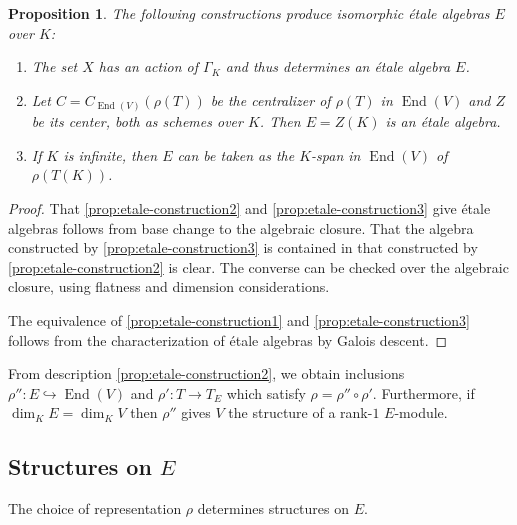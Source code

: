 \documentclass{article}
\theoremstyle{plain}
\newtheorem{proposition}[theorem]{Proposition}
\theoremstyle{definition}
\DeclareMathOperator{\End}{End}
\newcommand{\GalKbK}{\Gamma_K}
\begin{document}
\begin{proposition} \label{prop:etale-construction}
The following constructions produce isomorphic \'etale algebras $E$ over $K$:
\begin{enumerate}
\item \label{prop:etale-construction1} The set $X$ has an action of $\GalKbK$ and thus determines an \'etale algebra $E$.
\item \label{prop:etale-construction2} Let $C = C_{\End(V)}(\rho(T))$ be the centralizer of $\rho(T)$ in $\End(V)$ and $Z$ be its center, both as schemes over $K$.  Then $E = Z(K)$ is an \'etale algebra.
\item \label{prop:etale-construction3} If $K$ is infinite, then $E$ can be taken as the $K$-span in $\End(V)$ of $\rho(T(K))$.
\end{enumerate}
\end{proposition}
\begin{proof}
That \eqref{prop:etale-construction2} and \eqref{prop:etale-construction3} give \'etale algebras follows from base change to the algebraic closure.
That the algebra constructed by \eqref{prop:etale-construction3} is contained in that constructed by \eqref{prop:etale-construction2} is clear.
The converse can be checked over the algebraic closure, using flatness and dimension considerations.

The equivalence of \eqref{prop:etale-construction1} and \eqref{prop:etale-construction3} follows from the characterization of \'etale algebras by Galois descent.
\end{proof}

From description \eqref{prop:etale-construction2}, we obtain inclusions $\rho'' : E \hookrightarrow \End(V)$ and $\rho' : T \rightarrow T_E$ which satisfy $\rho = \rho''\circ\rho'$.  Furthermore, if $\dim_K E = \dim_K V$ then $\rho''$ gives $V$ the structure of a rank-$1$ $E$-module.

\subsection{Structures on $E$}

The choice of representation $\rho$ determines structures on $E$.
\end{document}
